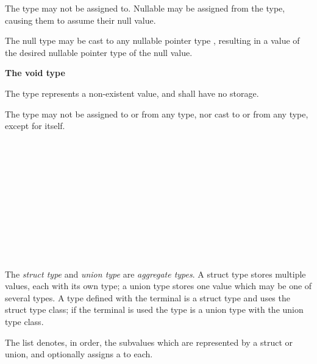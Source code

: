 \specsubsubitem
The  type may not be assigned to. Nullable  may be assigned from the  type, causing them to assume
their null value.

\specsubsubitem
The null type may be cast to any nullable pointer type , resulting in a value of the desired nullable pointer type of the null
value.

\textbf{The void type}

\specsubsubitem
The  type represents a non-existent value, and shall have no
storage.

\specsubsubitem
The  type may not be assigned to or from any type, nor cast to or
from any type, except for itself.


\begin{grammar}
 \\
	 \terminal{\{}  \terminal{\}} \\
	 \terminal{\{}  \terminal{\}} \\

 \\
	 \optional{\terminal{,}} \\
	 \terminal{,}  \\

 \\
	 \terminal{:}  \\
	 \\
	 \\
\end{grammar}

\specsubsubitem
The \textit{struct type} and \textit{union type} are \textit{aggregate types}.
A struct type stores multiple values, each with its own type; a union type
stores one value which may be one of several types. A type defined with the
 terminal is a struct type and uses the struct type class; if
the  terminal is used the type is a union type with the union
type class.

\specsubsubitem
The  list denotes, in order, the subvalues which are
represented by a struct or union, and optionally assigns a  to
each.

